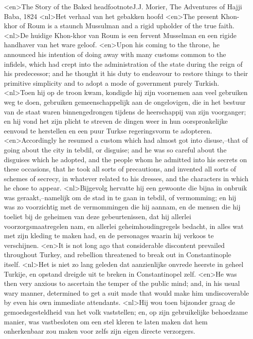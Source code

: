 <en>The Story of the Baked headfootnote{J.J. Morier, The Adventures of Hajji Baba, 1824}
<nl>Het verhaal van het gebakken hoofd
<en>The present Khon-khor of Roum is a staunch Mussulman and a rigid upholder of the true faith.
<nl>De huidige Khon-khor van Roum is een fervent Musselman en een rigide handhaver van het ware geloof.
<en>Upon his coming to the throne, he announced his intention of doing away with many customs common to the infidels, which had crept into the administration of the state during the reign of his predecessor; and he thought it his duty to endeavour to restore things to their primitive simplicity and to adopt a mode of government purely Turkish.
<nl>Toen hij op de troon kwam, kondigde hij zijn voornemen aan veel gebruiken  weg te doen, gebruiken gemeenschappelijk aan de ongelovigen, die in het bestuur van de staat waren binnengedrongen tijdens de heerschappij van zijn voorganger; en hij vond het zijn plicht te streven de dingen weer in hun oorspronkelijke eenvoud te herstellen en een  puur Turkse regeringsvorm te adopteren.
<en>Accordingly he resumed a custom which had almost got into disuse,--that of going about the city in tebdil, or disguise; and he was so careful about the disguises which he adopted, and the people whom he admitted into his secrets on these occasions, that he took all sorts of precautions, and invented all sorts of schemes of secrecy, in whatever related to his dresses, and the characters in which he chose to appear.
<nl>Bijgevolg hervatte hij een gewoonte die bijna in onbruik was geraakt,--namelijk om de stad in  te gaan  in tebdil, of vermomming; en hij was zo voorzichtig met de vermommingen die hij aannam, en de mensen die hij toeliet bij de geheimen van deze gebeurtenissen, dat hij allerlei voorzorgsmaatregelen nam, en allerlei geheimhoudingregels bedacht, in alles wat met zijn kleding te maken had, en de personages waarin hij verkoos te verschijnen.
<en>It is not long ago that considerable discontent prevailed throughout Turkey, and rebellion threatened to break out in Constantinople itself.
<nl>Het is niet zo lang geleden dat  aanzienlijke onvrede heerste in geheel Turkije, en opstand dreigde uit te breken in Constantinopel zelf.
<en>He was then very anxious to ascertain the temper of the public mind; and, in his usual wary manner, determined to get a suit made that would make him undiscoverable by even his own immediate attendants.
<nl>Hij wou  toen bijzonder graag de gemoedsgesteldheid van het volk vaststellen; en, op zijn gebruikelijke behoedzame manier, was vastbesloten om een stel kleren te laten maken dat hem onherkenbaar zou maken voor zelfs zijn eigen directe verzorgers.
